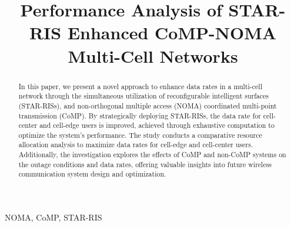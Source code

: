 \documentclass[conference]{IEEEtran}
\begin{document}
\title{Performance Analysis of STAR-RIS Enhanced CoMP-NOMA Multi-Cell Networks}

\author{
}
\maketitle

\begin{abstract}
In this paper, we present a novel approach to enhance data rates in a multi-cell network through the simultaneous utilization of reconfigurable intelligent surfaces (STAR-RISs), and non-orthogonal multiple access (NOMA) coordinated multi-point transmission (CoMP). By strategically deploying STAR-RISs, the data rate for cell-center and cell-edge users is improved, achieved through exhaustive computation to optimize the system's performance. The study conducts a comparative resource allocation analysis to maximize data rates for cell-edge and cell-center users. Additionally, the investigation explores the effects of CoMP and non-CoMP systems on the outage conditions and data rates, offering valuable insights into future wireless communication system design and optimization. 
\end{abstract}

\begin{IEEEkeywords}
	NOMA, CoMP, STAR-RIS
\end{IEEEkeywords}
\end{document}
